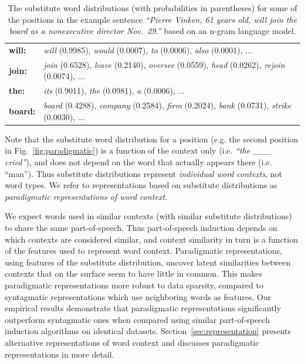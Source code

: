 \begin{table}[h]
\caption{The substitute word distributions (with probabilities in
  parentheses) for some of the positions in the example sentence
  \textit{``Pierre Vinken, 61 years old, will join the board as a
    nonexecutive director Nov.~29.''} based on an n-gram language
  model.}
\label{tab:subdist}
\begin{tabular}{|ll|} \hline
\textbf{will:} & \textit{will} (0.9985), \textit{would} (0.0007), \textit{to} (0.0006), \textit{also} (0.0001), $\ldots$ \\
\textbf{join:} & \textit{join} (0.6528), \textit{leave} (0.2140), \textit{oversee} (0.0559), \textit{head} (0.0262), \textit{rejoin} (0.0074), $\ldots$ \\
\textbf{the:}  &\textit{its} (0.9011), \textit{the} (0.0981), \textit{a} (0.0006), $\ldots$ \\
\textbf{board:} & \textit{board} (0.4288), \textit{company} (0.2584), \textit{firm} (0.2024), \textit{bank} (0.0731), \textit{strike} (0.0030), $\ldots$ \\
\hline
\end{tabular}
\end{table}

Note that the substitute word distribution for a position (e.g. the
second position in Fig.~\ref{fig:paradigmatic}) is a function of the
context only (i.e. \textit{``the \_\_\_ cried''}), and does not depend
on the word that actually appears there (i.e. ``man'').  Thus
substitute distributions represent {\em individual word contexts}, not
word types.  We refer to representations based on substitute
distributions as {\em paradigmatic representations of word context}.

We expect words used in similar contexts (with similar substitute
distributions) to share the same part-of-speech.  Thus part-of-speech
induction depends on which contexts are considered similar, and
context similarity in turn is a function of the features used to
represent word context.  Paradigmatic representations, using features
of the substitute distribution, uncover latent similarities between
contexts that on the surface seem to have little in common.  This
makes paradigmatic representations more robust to data sparsity,
compared to syntagmatic representations which use neighboring words as
features.  Our empirical results demonstrate that paradigmatic
representations significantly outperform syntagmatic ones when
compared using similar part-of-speech induction algorithms on
identical datasets.  Section~\ref{sec:representation} presents
alternative representations of word context and discusses paradigmatic
representations in more detail.

